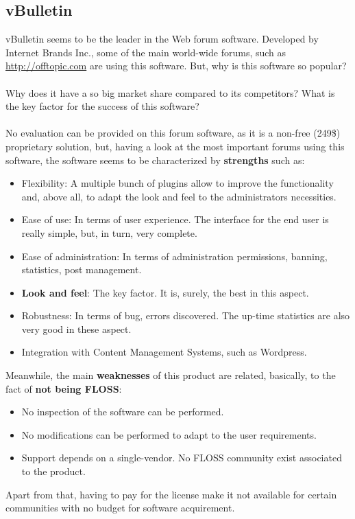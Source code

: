 \documentclass[11pt]{article}
\begin{document}
\subsection{vBulletin}
vBulletin seems to be the leader in the Web forum software. Developed by Internet Brands Inc., some of the main world-wide forums, such as \url{http://offtopic.com} are using this software. But, why is this software so popular?\\
\\
Why does it have a so big market share compared to its competitors? What is the key factor for the success of this software?\\
\\
No evaluation can be provided on this forum software, as it is a non-free (249\$) proprietary solution, but, having a look at the most important forums using this software, the software seems to be characterized by \textbf{strengths} such as:
\begin{itemize}\itemsep0pt
\item{Flexibility}: A multiple bunch of plugins allow to improve the functionality and, above all, to adapt the look and feel to the administrators necessities.
\item{Ease of use}: In terms of user experience. The interface for the end user is really simple, but, in turn, very complete. 
\item{Ease of administration}: In terms of administration permissions, banning, statistics, post management.
\item{\textbf{Look and feel}}: The key factor. It is, surely, the best in this aspect.
\item{Robustness}: In terms of bug, errors discovered. The up-time statistics are also very good in these aspect.
\item{Integration with Content Management Systems}, such as Wordpress.
\end{itemize}
Meanwhile, the main \textbf{weaknesses} of this product are related, basically, to the fact of \textbf{not being FLOSS}:
\begin{itemize}\itemsep0pt
\item{No inspection of the software can be performed.}
\item{No modifications can be performed to adapt to the user requirements.}
\item{Support depends on a single-vendor. No FLOSS community exist associated to the product.}
\end{itemize}
Apart from that, having to pay for the license make it not available for certain communities with no budget for software acquirement.
\end{document}
